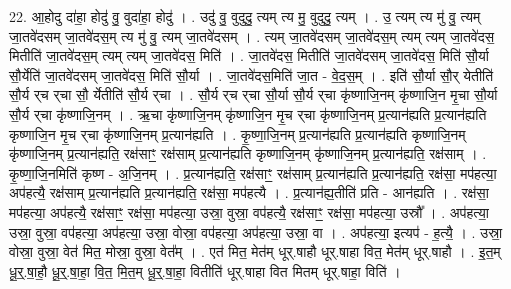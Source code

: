 \documentclass[17pt]{extarticle}
\begin{document}
22. आ॒होदु दा॑हा॒ होदु॑ वु॒ वुदा॑हा॒ होदु॑ । . उदु॑ वु॒ वुदुदु॒ त्यम् त्य मु॒ वुदुदु॒ त्यम् । . उ॒ त्यम् त्य मु॑ वु॒ त्यम् जा॒तवे॑दसम् जा॒तवे॑दस॒म् त्य मु॑ वु॒ त्यम् जा॒तवे॑दसम् । . त्यम् जा॒तवे॑दसम् जा॒तवे॑दस॒म् त्यम् त्यम् जा॒तवे॑दस॒ मितीति॑ जा॒तवे॑दस॒म् त्यम् त्यम् जा॒तवे॑दस॒ मिति॑ । . जा॒तवे॑दस॒ मितीति॑ जा॒तवे॑दसम् जा॒तवे॑दस॒ मिति॑ सौ॒र्या सौ॒र्येति॑ जा॒तवे॑दसम् जा॒तवे॑दस॒ मिति॑ सौ॒र्या । . जा॒तवे॑दस॒मिति॑ जा॒त - वे॒द॒स॒म् । . इति॑ सौ॒र्या सौ॒र् येतीति॑ सौ॒र्य र्‌च र्‌चा सौ॒ र्येतीति॑ सौ॒र्य र्‌चा । . सौ॒र्य र्‌च र्‌चा सौ॒र्या सौ॒र्य र्‌चा कृ॑ष्णाजि॒नम् कृ॑ष्णाजि॒न मृ॒चा सौ॒र्या सौ॒र्य र्‌चा कृ॑ष्णाजि॒नम् । . ऋ॒चा कृ॑ष्णाजि॒नम् कृ॑ष्णाजि॒न मृ॒च र्‌चा कृ॑ष्णाजि॒नम् प्र॒त्यान॑ह्यति प्र॒त्यान॑ह्यति कृष्णाजि॒न मृ॒च र्‌चा कृ॑ष्णाजि॒नम् प्र॒त्यान॑ह्यति । . कृ॒ष्णा॒जि॒नम् प्र॒त्यान॑ह्यति प्र॒त्यान॑ह्यति कृष्णाजि॒नम् कृ॑ष्णाजि॒नम् प्र॒त्यान॑ह्यति॒ रक्ष॑साꣳ॒॒ रक्ष॑साम् प्र॒त्यान॑ह्यति कृष्णाजि॒नम् कृ॑ष्णाजि॒नम् प्र॒त्यान॑ह्यति॒ रक्ष॑साम् । . कृ॒ष्णा॒जि॒नमिति॑ कृष्ण - अ॒जि॒नम् । . प्र॒त्यान॑ह्यति॒ रक्ष॑साꣳ॒॒ रक्ष॑साम् प्र॒त्यान॑ह्यति प्र॒त्यान॑ह्यति॒ रक्ष॑सा॒ मप॑हत्या॒ अप॑हत्यै॒ रक्ष॑साम् प्र॒त्यान॑ह्यति प्र॒त्यान॑ह्यति॒ रक्ष॑सा॒ मप॑हत्यै । . प्र॒त्यान॑ह्य॒तीति॑ प्रति - आन॑ह्यति । . रक्ष॑सा॒ मप॑हत्या॒ अप॑हत्यै॒ रक्ष॑साꣳ॒॒ रक्ष॑सा॒ मप॑हत्या॒ उस्रा॒ वुस्रा॒ वप॑हत्यै॒ रक्ष॑साꣳ॒॒ रक्ष॑सा॒ मप॑हत्या॒ उस्रौ᳚ । . अप॑हत्या॒ उस्रा॒ वुस्रा॒ वप॑हत्या॒ अप॑हत्या॒ उस्रा॒ वोस्रा॒ वप॑हत्या॒ अप॑हत्या॒ उस्रा॒ वा । . अप॑हत्या॒ इत्यप॑ - ह॒त्यै॒ । . उस्रा॒ वोस्रा॒ वुस्रा॒ वेत॑ मित॒ मोस्रा॒ वुस्रा॒ वेत᳚म् । . एत॑ मित॒ मेत॑म् धूर्.षाहौ धूर्.षाहा वित॒ मेत॑म् धूर्.षाहौ । . इ॒त॒म् धू॒र्॒.षा॒हौ॒ धू॒र्॒.षा॒हा॒ वि॒त॒ मि॒त॒म् धू॒र्॒.षा॒हा॒ वितीति॑ धूर्.षाहा वित मितम् धूर्.षाहा॒ विति॑ । \newline
\end{document}
